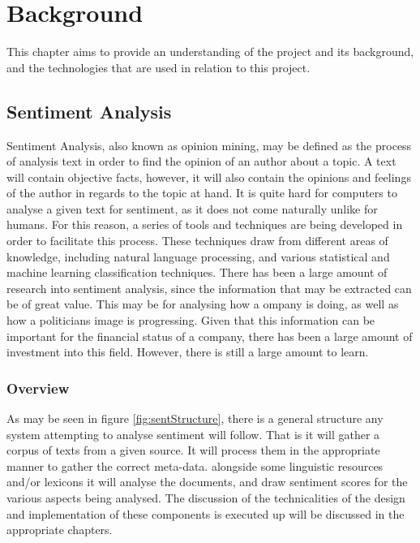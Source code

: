 
\chapter{Background}

This chapter aims to provide an understanding of the project and its background, and the technologies that are used in relation to this project.

\section{Sentiment Analysis}

Sentiment Analysis, also known as opinion mining, may be defined as the process of analysis text in order to find the opinion of an author about a topic\cite{feldman2013techniques}. A text will contain objective facts, however, it will also contain the opinions and feelings of the author in regards to the topic at hand. It is quite hard for computers to analyse a given text for sentiment, as it does not come naturally unlike for humans. For this reason, a series of tools and techniques are being developed in order to facilitate this process. These techniques draw from different areas of knowledge, including natural language processing, and various statistical and machine learning classification techniques. There has been a large amount of research into sentiment analysis, since the information that may be extracted can be of great value. This may be for analysing how a ompany is doing, as well as how a politicians image is progressing. Given that this information can be important for the financial status of a company, there has been a large amount of investment into this field. However, there is still a large amount to learn.

\subsection{Overview}

As may be seen in figure \ref{fig:sentStructure}, there is a general structure any system attempting to analyse sentiment will follow. That is it will gather a corpus of texts from a given source. It will process them in the appropriate manner to gather the correct meta-data. alongside some linguistic resources and/or lexicons it will analyse the documents, and draw sentiment scores for the various aspects being analysed. The discussion of the technicalities of the design and implementation of these components is executed up will be discussed in the appropriate chapters.

